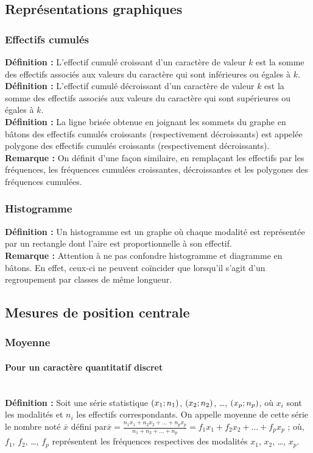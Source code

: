 \documentclass[a4paper,titlepage]{article}
\let\oldleft\left
\renewcommand{\left}{\mathopen{}\mathclose\bgroup\oldleft}
\let\oldright\right
\renewcommand{\right}{\aftergroup\egroup\oldright}
\begin{document}
    \subsection{Représentations graphiques}
        \subsubsection{Effectifs cumulés}
            \textbf{Définition :} L’effectif cumulé croissant d’un caractère de valeur $k$ est la somme des effectifs associés aux valeurs du caractère qui sont inférieures ou égales à $k$.
            \\
            \textbf{Définition :} L’effectif cumulé décroissant d’un caractère de valeur $k$ est la somme des effectifs associés aux valeurs du caractère qui sont supérieures ou égales à $k$.
            \\
            \textbf{Définition :} La ligne brisée obtenue en joignant les sommets du graphe en bâtons des effectifs cumulés croissants (respectivement décroissants) est appelée polygone des effectifs cumulés croissants (respectivement décroissants).
            \\
            \textbf{Remarque :} On définit d’une façon similaire, en remplaçant les effectifs par les fréquences, les fréquences cumulées croissantes, décroissantes et les polygones des fréquences cumulées.
        \subsubsection{Histogramme}
            \textbf{Définition :} Un histogramme est un graphe où chaque modalité est représentée par un rectangle dont l’aire est proportionnelle à son effectif.
            \\
            \textbf{Remarque :} Attention à ne pas confondre histogramme et diagramme en bâtons. En effet, ceux-ci ne peuvent coïncider que lorsqu’il s’agit d’un regroupement par classes de même longueur.
    \subsection{Mesures de position centrale}
        \subsubsection{Moyenne}
            \paragraph{Pour un caractère quantitatif discret}\mbox{}\\
                \textbf{Définition :} Soit une série statistique $\left(x_{1};n_{1}\right)$, $\left(x_{2};n_{2}\right)$, \ldots, $\left(x_{p};n_{p}\right)$, où $x_{i}$ sont les modalités et $n_{i}$ les effectifs correspondants. On appelle moyenne de cette série le nombre noté $\overline{x}$ défini par\linebreak$\overline{x}=\frac{n_{1}x_{1}+n_{2}x_{2}+\ldots+n_{p}x_{p}}{n_{1}+n_{2}+\ldots+n_{p}}=f_{1}x_{1}+f_{2}x_{2}+\ldots+f_{p}x_{p}$ ; où, $f_{1}$, $f_{2}$, \ldots, $f_{p}$ représentent les fréquences respectives des modalités $x_{1}$, $x_{2}$, \ldots, $x_{p}$.
\end{document}
